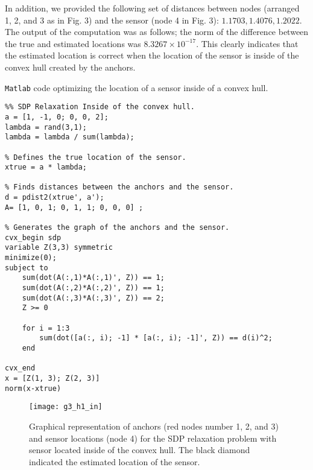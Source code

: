 \documentclass[12pt,letterpaper]{article}
\begin{document}
In addition, we provided the following set of distances between nodes (arranged 1, 2, and 3 as in Fig. 3) and the sensor (node 4 in Fig. 3): $1.1703, 1.4076, 1.2022$. The output of the computation was as follows; the norm of the difference between the true and estimated locations was $8.3267\times10^{-17}$. This clearly indicates that the estimated location is correct when the location of the sensor is inside of the convex hull created by the anchors. 
~\\
\begin{center}
\texttt{Matlab} code optimizing the location of a sensor inside of a convex hull.  
\end{center}
\begin{lstlisting}
%% SDP Relaxation Inside of the convex hull.
a = [1, -1, 0; 0, 0, 2];
lambda = rand(3,1);
lambda = lambda / sum(lambda);

% Defines the true location of the sensor.
xtrue = a * lambda; 

% Finds distances between the anchors and the sensor.
d = pdist2(xtrue', a');
A= [1, 0, 1; 0, 1, 1; 0, 0, 0] ;

% Generates the graph of the anchors and the sensor.
cvx_begin sdp
variable Z(3,3) symmetric
minimize(0);
subject to
	sum(dot(A(:,1)*A(:,1)', Z)) == 1;
	sum(dot(A(:,2)*A(:,2)', Z)) == 1;
	sum(dot(A(:,3)*A(:,3)', Z)) == 2;
 	Z >= 0
	
	for i = 1:3
        sum(dot([a(:, i); -1] * [a(:, i); -1]', Z)) == d(i)^2;
    end
 	
cvx_end
x = [Z(1, 3); Z(2, 3)]
norm(x-xtrue)
\end{lstlisting}

\newpage
\begin{figure}[h]
\begin{center}
\texttt{[image: g3\_h1\_in]}
\end{center}
\caption{Graphical representation of anchors (red nodes number 1, 2, and 3) and sensor locations (node 4) for the SDP relaxation problem with sensor located inside of the convex hull. The black diamond indicated the estimated location of the sensor.}
\end{figure}
\end{document}

